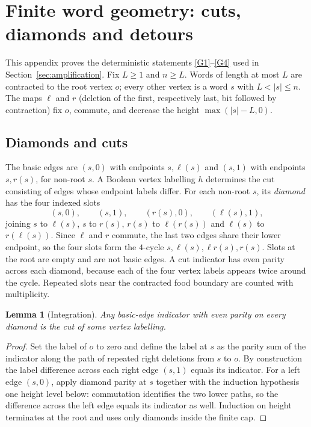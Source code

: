 \documentclass[11pt,reqno]{amsart}
\theoremstyle{plain}
\newtheorem{lemma}[theorem]{Lemma}
\theoremstyle{definition}
\theoremstyle{remark}
\numberwithin{equation}{section}
\begin{document}
\section{Finite word geometry: cuts, diamonds and detours}\label{app:geometry}

This appendix proves the deterministic statements \ref{G1}--\ref{G4} used in Section~\ref{sec:amplification}. Fix $L\ge1$ and $n\ge L$. Words of length at most $L$ are contracted to the root vertex $o$; every other vertex is a word $s$ with $L<|s|\le n$. The maps $\ell$ and $r$ (deletion of the first, respectively last, bit followed by contraction) fix $o$, commute, and decrease the height $\max(|s|-L,0)$.

\subsection{Diamonds and cuts}
The basic edges are $(s,0)$ with endpoints $s,\ell(s)$ and $(s,1)$ with endpoints $s,r(s)$, for non-root $s$. A Boolean vertex labelling $h$ determines the cut consisting of edges whose endpoint labels differ. For each non-root $s$, its \emph{diamond} has the four indexed slots
\begin{equation}\label{eq:diamond}
(s,0),\qquad(s,1),\qquad(r(s),0),\qquad(\ell(s),1),
\end{equation}
joining $s$ to $\ell(s)$, $s$ to $r(s)$, $r(s)$ to $\ell(r(s))$ and $\ell(s)$ to $r(\ell(s))$. Since $\ell$ and $r$ commute, the last two edges share their lower endpoint, so the four slots form the $4$-cycle $s,\ell(s),\ell r(s),r(s)$. Slots at the root are empty and are not basic edges. A cut indicator has even parity across each diamond, because each of the four vertex labels appears twice around the cycle. Repeated slots near the contracted food boundary are counted with multiplicity.

\begin{lemma}[Integration]\label{lem:integration}
Any basic-edge indicator with even parity on every diamond is the cut of some vertex labelling.
\end{lemma}

\begin{proof}
Set the label of $o$ to zero and define the label at $s$ as the parity sum of the indicator along the path of repeated right deletions from $s$ to $o$. By construction the label difference across each right edge $(s,1)$ equals its indicator. For a left edge $(s,0)$, apply diamond parity at $s$ together with the induction hypothesis one height level below: commutation identifies the two lower paths, so the difference across the left edge equals its indicator as well. Induction on height terminates at the root and uses only diamonds inside the finite cap.
\end{proof}
\end{document}
